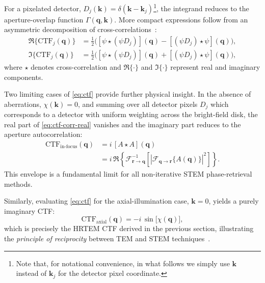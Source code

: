 \documentclass[pdflatex,sn-aps,iicol]{sn-jnl}%
\begin{document}
For a pixelated detector, $D_j(\boldsymbol{k})=\delta(\boldsymbol{k}-\boldsymbol{k}_j)$\footnote{Note that, for notational convenience, in what follows we simply use $\boldsymbol{k}$ instead of $\boldsymbol{k}_j$ for the detector pixel coordinate.}, the integrand reduces to the aperture-overlap function $\Gamma(\boldsymbol{q},\boldsymbol{k})$.
More compact expressions follow from an asymmetric decomposition of cross-correlations~\cite{Bekkevold_2025,Lazic_2017}:
\begin{align}
  \Re\{\mathrm{CTF}_j(\boldsymbol{q})\} &= \frac{1}{2}
   \Big(
    [\psi \star (\psi D_j)](\boldsymbol{q})
    -
    [(\psi D_j)\star \psi](\boldsymbol{q})
  \Big),
  \label{eq:ctf-corr-real} \\
  \Im\{\mathrm{CTF}_j(\boldsymbol{q})\} &= \frac{1}{2}
  \Big(
    [\psi \star (\psi D_j)](\boldsymbol{q})
    +
    [(\psi D_j)\star \psi](\boldsymbol{q})
  \Big),
  \label{eq:ctf-corr-imag}
\end{align}
where $\star$ denotes cross-correlation and $\Re\{\cdot\}$ and $\Im\{\cdot\}$ represent real and imaginary components.

Two limiting cases of \cref{eq:ctf} provide further physical insight.
In the absence of aberrations, $\chi(\boldsymbol{k})=0$, and summing over all detector pixels $D_j$ which corresponds to a detector with uniform weighting across the bright-field disk, the real part of \cref{eq:ctf-corr-real} vanishes and the imaginary part reduces to the aperture autocorrelation:
\begin{align}
  \mathrm{CTF}_{\text{in-focus}}(\boldsymbol{q}) &= i\,[A\star A](\boldsymbol{q}) \nonumber \\
  &= i\,\Re\!\left\{ \mathcal{F}^{-1}_{\boldsymbol{r}\rightarrow\boldsymbol{q}} \left[ \left| \mathcal{F}_{\boldsymbol{q}\rightarrow\boldsymbol{r}}\{A(\boldsymbol{q})\} \right|^2 \right] \right\}.
  \label{eq:infocus-ctf}
\end{align}
This envelope is a fundamental limit for all non-iterative STEM phase-retrieval methods.

Similarly, evaluating \cref{eq:ctf} for the axial-illumination case, $\boldsymbol{k}=0$, yields a purely imaginary CTF:
\begin{equation}
  \mathrm{CTF}_{\text{axial}}(\boldsymbol{q}) = - i\,\sin\!\big[\chi(\boldsymbol{q})\big],
  \label{eq:ctf-axial}
\end{equation}
which is precisely the HRTEM CTF derived in the previous section, illustrating the \emph{principle of reciprocity} between TEM and STEM techniques~\cite{Williams_2009,Carter_2016,Kirkland_2020}.
\end{document}
